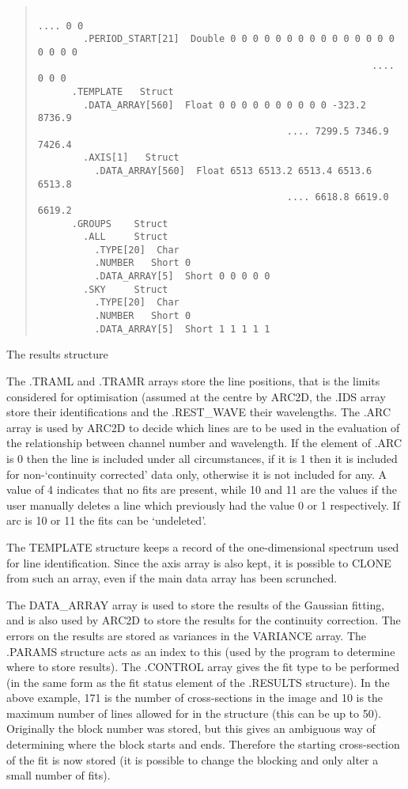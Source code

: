 \begin{table}
\begin{quote}
\begin{verbatim}
                                                             .... 0 0
        .PERIOD_START[21]  Double 0 0 0 0 0 0 0 0 0 0 0 0 0 0 0 0 0 0 0
                                                           .... 0 0 0
      .TEMPLATE   Struct
        .DATA_ARRAY[560]  Float 0 0 0 0 0 0 0 0 0 0 -323.2 8736.9
                                            .... 7299.5 7346.9 7426.4
        .AXIS[1]   Struct
          .DATA_ARRAY[560]  Float 6513 6513.2 6513.4 6513.6 6513.8
                                            .... 6618.8 6619.0 6619.2
      .GROUPS    Struct
        .ALL     Struct
          .TYPE[20]  Char
          .NUMBER   Short 0
          .DATA_ARRAY[5]  Short 0 0 0 0 0
        .SKY     Struct
          .TYPE[20]  Char
          .NUMBER   Short 0
          .DATA_ARRAY[5]  Short 1 1 1 1 1
 \end{verbatim}\end{quote}
\caption[a]{The results structure}
\label{tb.res}
\end{table}
 The .TRAML and .TRAMR arrays store the line positions, that is
the limits considered for optimisation (assumed at
the centre by ARC2D, the .IDS array store their identifications and
the .REST\_WAVE their wavelengths. The .ARC array is used by ARC2D to
decide which lines are to be used in the evaluation of the relationship
between channel number and wavelength. If the element of .ARC
is 0 then the line is included under all circumstances, if it is 1 then
it is included for non-`continuity corrected' data only, otherwise it is
not included for any. A value of 4 indicates that no fits are present,
while 10 and 11 are the values if the user manually deletes a line which
previously had the value 0 or 1 respectively. If arc is 10 or 11 the fits
can be `undeleted'.

The TEMPLATE structure keeps a record of the one-dimensional spectrum
used for line identification.
Since the axis array is also kept, it is possible to CLONE from such an
array, even if the main data array has been scrunched.

The DATA\_ARRAY array is used to store the results of the Gaussian fitting,
and is also used by ARC2D to store the results for the continuity
correction. The errors on the results are stored as variances in the
VARIANCE array. The .PARAMS structure acts as an index to this (used by
the program to determine where to store results).
The .CONTROL array gives the fit type to be performed (in the same form
as the fit status element of the .RESULTS structure).
In the
above example, 171 is the number of cross-sections in the image and 10
is the maximum number of lines allowed for in the structure (this can
be up to 50). Originally the block number was stored, but this gives an
ambiguous way of determining where the block starts and ends. Therefore
the starting cross-section of the fit is now stored (it is possible to
change the blocking and only alter a small number of fits).

